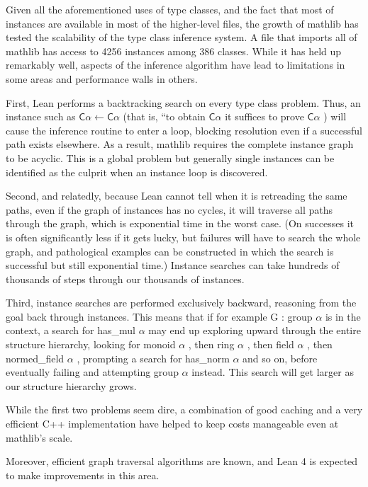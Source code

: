 \documentclass[
]{article}
\begin{document}
Given all the aforementioned uses of type classes, and the fact that
most of instances are available in most of the higher-level files, the
growth of mathlib has tested the scalability of the type class inference
system. A file that imports all of mathlib has access to 4256 instances
among 386 classes. While it has held up remarkably well, aspects of the
inference algorithm have lead to limitations in some areas and
performance walls in others.

First, Lean performs a backtracking search on every type class problem.
Thus, an instance such as
\(\mathsf{C} \alpha \leftarrow \mathsf{C} \alpha\) (that is, ``to obtain
\(\mathsf{C} \alpha\) it suffices to prove \(\mathsf{C} \alpha\) ) will
cause the inference routine to enter a loop, blocking resolution even if
a successful path exists elsewhere. As a result, mathlib requires the
complete instance graph to be acyclic. This is a global problem but
generally single instances can be identified as the culprit when an
instance loop is discovered.

Second, and relatedly, because Lean cannot tell when it is retreading
the same paths, even if the graph of instances has no cycles, it will
traverse all paths through the graph, which is exponential time in the
worst case. (On successes it is often significantly less if it gets
lucky, but failures will have to search the whole graph, and
pathological examples can be constructed in which the search is
successful but still exponential time.) Instance searches can take
hundreds of thousands of steps through our thousands of instances.

Third, instance searches are performed exclusively backward, reasoning
from the goal back through instances. This means that if for example G :
group \(\alpha\) is in the context, a search for has\_mul \(\alpha\) may
end up exploring upward through the entire structure hierarchy, looking
for monoid \(\alpha\) , then ring \(\alpha\) , then field \(\alpha\) ,
then normed\_field \(\alpha\) , prompting a search for has\_norm
\(\alpha\) and so on, before eventually failing and attempting group
\(\alpha\) instead. This search will get larger as our structure
hierarchy grows.

While the first two problems seem dire, a combination of good caching
and a very efficient C++ implementation have helped to keep costs
manageable even at mathlib's scale.

Moreover, efficient graph traversal algorithms are known, and Lean 4 is
expected to make improvements in this area.
\end{document}
